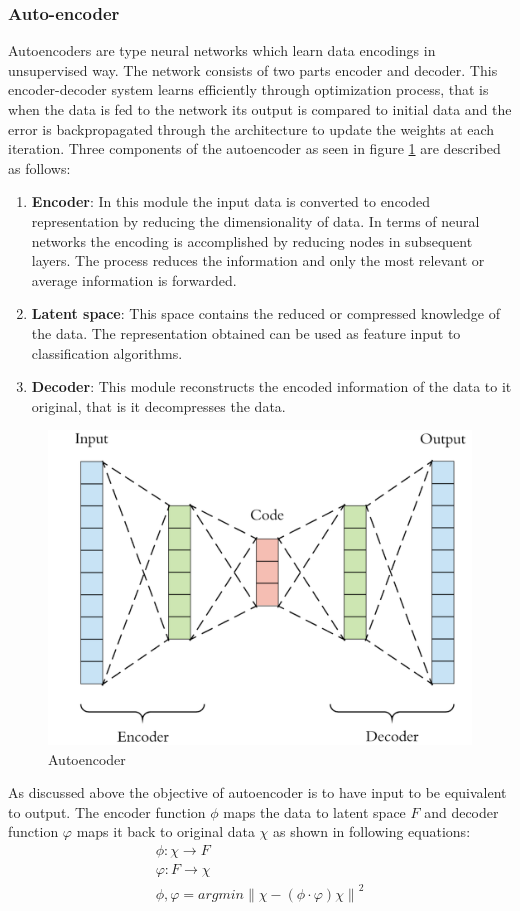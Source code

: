     \subsubsection{Auto-encoder}
    Autoencoders are type neural networks which learn data encodings in unsupervised way. The network consists of two parts encoder and decoder. This encoder-decoder system learns efficiently through optimization process, that is when the data is fed to the network its output is compared to initial data and the error is backpropagated through the architecture to update the weights at each iteration. Three components of the autoencoder as seen in figure \ref{l4} are described as follows:
    \begin{enumerate}
    	\item \textbf{Encoder}: In this module the input data is converted to encoded representation by reducing the dimensionality of data. In terms of neural networks the encoding is accomplished by reducing nodes in subsequent layers.
    	The process reduces the information and only the most relevant or average information is forwarded.
    	\item \textbf{Latent space}: This space contains the reduced or compressed knowledge of the data. The representation obtained can be used as feature input to classification algorithms.
   	
    	\item \textbf{ Decoder}: This module reconstructs the encoded information of the data to it original, that is it decompresses the data.  
    \end{enumerate}
    
     \begin{figure}[h]
     	\centering
     	\includegraphics[width=0.6\linewidth]{images/auto.png}
     	\caption{Autoencoder \cite{auto}}
     	\label{l4}	
     \end{figure}
As discussed above the objective of autoencoder is to have input to be equivalent to output. The encoder function $\phi$ maps the data to latent space $F$ and decoder function $\varphi$ maps it back to original data $\chi$ as shown in following equations:
\begin{gather}
\phi: \chi \to F \\
\varphi : F\to \chi\\
\phi ,\varphi =arg min\left \|\chi -(\phi \cdot \varphi )\chi  \right \|^2
\end{gather}

